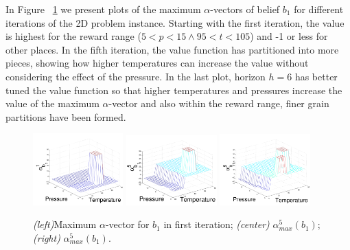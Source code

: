 \documentclass{article} %
\begin{document}
In Figure ~\ref{fig:3D}  we present plots of the maximum $\alpha$-vectors of belief $b_1$ for different iterations of the 2D problem instance. %
Starting with the first iteration, the value is highest for the reward range ($5<p<15 \wedge 95<t<105$) and -1 or less for other places. In the fifth iteration, the value function has partitioned into more pieces, showing how higher temperatures can increase the value without considering the effect of the pressure. In the last plot, horizon $h=6$ has better tuned the value function so that higher temperatures and pressures increase the value of the maximum $\alpha$-vector and also within the reward range, finer grain partitions have been formed. %
\begin{figure}[tbp!]
\centering
\includegraphics[width=0.31\textwidth]{pics/2d1.pdf}
\includegraphics[width=0.31\textwidth]{pics/2d9.pdf}
\includegraphics[width=0.31\textwidth]{pics/2d111.pdf}
\vspace{-3mm}
\caption{\footnotesize 
{\it (left)}Maximum $\alpha$-vector for $b_1$ in first iteration; 
{\it (center)} $\alpha_{max}^5(b_1)$; 
{\it (right)} $\alpha_{max}^5(b_1)$.%
}
\label{fig:3D}
\end{figure}
\end{document}
